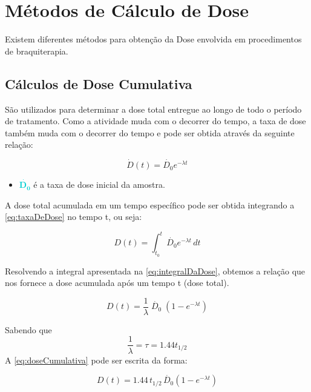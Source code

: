 \documentclass[11pt,a4paper]{article}
\newcounter{exemplo}
\begin{document}
\section{Métodos de Cálculo de Dose}

		Existem diferentes métodos para obtenção da Dose envolvida em procedimentos de braquiterapia. 

\subsection*{Cálculos de Dose Cumulativa}

	São utilizados para determinar a dose total entregue ao longo de todo o período de tratamento. Como a atividade muda com o decorrer do tempo, a taxa de dose também muda com o decorrer do tempo e pode ser obtida através da seguinte relação:

				\begin{equation}
					\dot{D}(t) = \dot{D_0} e^{-\lambda t}
					\label{eq:taxaDeDose}
				\end{equation}

	\begin{exemplo}[onde,]
		\begin{itemize}
			\item \textcolor{DarkTurquoise}{$\mathbf{\dot{D_0}}$} é a taxa de dose inicial da amostra.
		\end{itemize}
	\end{exemplo}


	A dose total acumulada em um tempo específico pode ser obtida integrando a   \ref{eq:taxaDeDose} no tempo t, ou seja:

				\begin{equation}
					D(t) = \int_{t_0}^{t} \dot{D_0} e^{-\lambda t}\,dt
					\label{eq:integralDaDose}
				\end{equation}

	Resolvendo a integral apresentada na   \ref{eq:integralDaDose}, obtemos a relação que nos fornece a dose acumulada após um tempo t (dose total).

				\begin{equation}
					D(t) = \frac{1}{\lambda} \; \dot{D_0} \; (1 - e^{-\lambda t})
					\label{eq:doseCumulativa}
				\end{equation}

	Sabendo que $$\frac{1}{\lambda} = \tau = 1.44 t_{1/2}$$ A   \ref{eq:doseCumulativa} pode ser escrita da forma:

				\begin{equation}
					D(t) = 1.44\,t_{1/2} \,\dot{D_0} (1 - e^{-\lambda t})
				\end{equation}
\end{document}
